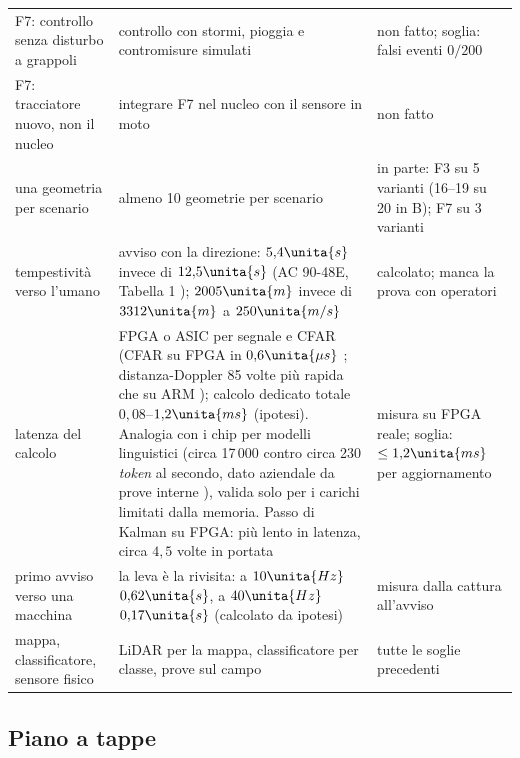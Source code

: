 {\begin{longtable}{@{}>{\RaggedRight\arraybackslash}p{3.3cm}>{\RaggedRight\arraybackslash}p{5.6cm}>{\RaggedRight\arraybackslash}p{5.8cm}@{}}
F7: controllo senza disturbo a grappoli & controllo con stormi, pioggia e contromisure simulati & non fatto; soglia: falsi eventi $0/200$\\
F7: tracciatore nuovo, non il nucleo & integrare F7 nel nucleo con il sensore in moto & non fatto\\
una geometria per scenario & almeno 10 geometrie per scenario & in parte: F3 su 5 varianti (16--19 su 20 in B); F7 su 3 varianti\\
tempestività verso l'umano & avviso con la direzione: $5{,}4\unita{s}$ invece di $12{,}5\unita{s}$ (AC 90-48E, Tabella 1 \cite{faa-ac-90-48e}); $2005\unita{m}$ invece di $3312\unita{m}$ a $250\unita{m/s}$ & calcolato; manca la prova con operatori\\
latenza del calcolo & FPGA o ASIC per segnale e CFAR (CFAR su FPGA in $0{,}6\unita{\mu s}$ \cite{sim2023}; distanza-Doppler 85 volte più rapida che su ARM \cite{choi2021}); calcolo dedicato totale $0{,}08$--$1{,}2\unita{ms}$ (ipotesi). Analogia con i chip per modelli linguistici (circa 17\,000 contro circa 230 \emph{token} al secondo, dato aziendale da prove interne \cite{heise2026-taalas}), valida solo per i carichi limitati dalla memoria. Passo di Kalman su FPGA: più lento in latenza, circa $4{,}5$ volte in portata \cite{summers2018} & misura su FPGA reale; soglia: $\le1{,}2\unita{ms}$ per aggiornamento\\
primo avviso verso una macchina & la leva è la rivisita: a $10\unita{Hz}$ $0{,}62\unita{s}$, a $40\unita{Hz}$ $0{,}17\unita{s}$ (calcolato da ipotesi) & misura dalla cattura all'avviso\\
mappa, classificatore, sensore fisico & LiDAR per la mappa, classificatore per classe, prove sul campo & tutte le soglie precedenti\\
\end{longtable}}

\subsection{Piano a tappe}\label{sec:ps-piano}

